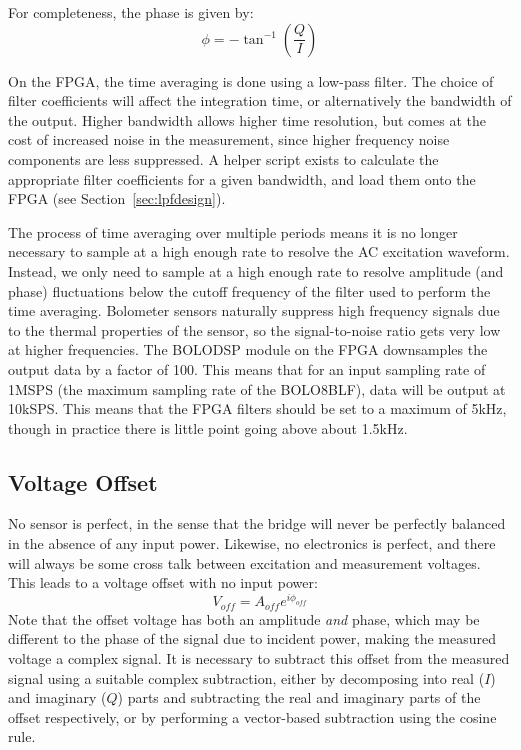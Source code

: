 \documentclass[12pt,a4paper]{article}
\begin{document}
For completeness, the phase is given by:
\begin{equation}
  \label{equ:phi}
  \phi = -\tan^{-1}\left(\frac{Q}{I}\right)
\end{equation}

On the FPGA, the time averaging is done using a low-pass filter. The choice of filter coefficients will affect the integration time, or alternatively the
bandwidth of the output. Higher bandwidth allows higher time resolution, but comes at the cost of increased noise in the measurement, since higher
frequency noise components are less suppressed. A helper script exists to calculate the appropriate filter coefficients for a given bandwidth, and load
them onto the FPGA (see Section~\ref{sec:lpfdesign}).

The process of time averaging over multiple periods means it is no longer necessary to sample at a high enough rate to resolve the AC excitation
waveform. Instead, we only need to sample at a high enough rate to resolve amplitude (and phase) fluctuations below the cutoff frequency of the filter
used to perform the time averaging. Bolometer sensors naturally suppress high frequency signals due to the thermal properties of the sensor, so the
signal-to-noise ratio gets very low at higher frequencies. The BOLODSP module on the FPGA downsamples the output data by a factor of 100. This
means that for an input sampling rate of 1MSPS (the maximum sampling rate of the BOLO8BLF), data will be output at 10kSPS\@. This means that the FPGA
filters should be set to a maximum of 5kHz, though in practice there is little point going above about 1.5kHz.

\subsection{Voltage Offset}
\label{sec:offset}
No sensor is perfect, in the sense that the bridge will never be perfectly balanced in the absence of any input power. Likewise, no electronics is perfect,
and there will always be some cross talk between excitation and measurement voltages. This leads to a voltage offset with no input power:
\begin{equation}
  \label{equ:voff}
  V_{off} = A_{off}e^{i\phi_{off}}
\end{equation}
Note that the offset voltage has both an amplitude \textit{and} phase, which may be different to the phase of the signal due to incident power, making the
measured voltage a complex signal. It is necessary to subtract this offset from the measured signal using a suitable complex subtraction, either by
decomposing into real ($I$) and imaginary ($Q$) parts and subtracting the real and imaginary parts of the offset respectively, or by performing a
vector-based subtraction using the cosine rule.
\end{document}

